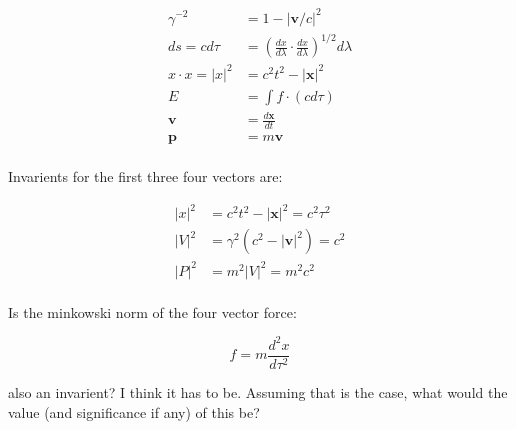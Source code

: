\documentclass{article}      %
\begin{document}
\begin{align*}
\gamma^{-2} &= 1 - {\lvert \mathbf{v}/c \rvert}^2 \\
ds = c d\tau &= {\left(\frac{dx}{d\lambda} \cdot \frac{dx}{d\lambda}\right)}^{1/2} d\lambda \\
x \cdot x = {\lvert x \rvert}^2 &= c^2t^2 - {\lvert \mathbf{x} \rvert}^2 \\
E &= \int f \cdot (c d\tau) \\
\mathbf{v} &= \frac{d\mathbf{x}}{dt} \\
\mathbf{p} &= m\mathbf{v} \\
\end{align*}

Invarients for the first three four vectors are:

\begin{align*}
{\lvert x \rvert}^2 &= c^2 t^2 - {\lvert \mathbf{x} \rvert}^2 = c^2 \tau^2 \\
{\lvert V \rvert}^2 &= \gamma^2 (c^2 - {\lvert \mathbf{v} \rvert}^2) = c^2 \\
{\lvert P \rvert}^2 &= m^2 {\lvert V \rvert}^2 = m^2 c^2 \\
\end{align*}

Is the minkowski norm of the four vector force:

\[
f = m\frac{d^2 x}{d\tau^2} 
\]

also an invarient?  I think it has to be.  Assuming that is the case, what would the value (and significance if any) of this be?
\end{document}
